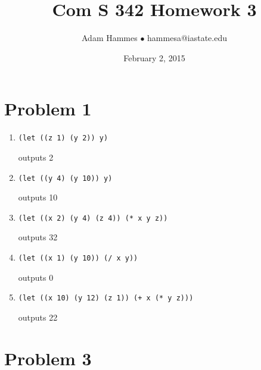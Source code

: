 \documentclass[11pt]{article}
\newcommand{\code}[1]{\texttt{#1}}
\begin{document}
\title{Com S 342 Homework 3}
\author{Adam Hammes $\bullet$ hammesa@iastate.edu}
\date{February 2, 2015}
\maketitle


\section*{Problem 1}

\begin{enumerate}
	\item 
		\code{(let ((z 1) (y 2)) y)}

		outputs 2

	\item
		\code{(let ((y 4) (y 10)) y)}

		outputs 10

	\item
		\code{(let ((x 2) (y 4) (z 4)) (* x y z))}

		outputs 32

	\item
		\code{(let ((x 1) (y 10)) (/ x y))}

		outputs 0

	\item
		\code{(let ((x 10) (y 12) (z 1)) (+ x (* y z)))}

		outputs 22

\end{enumerate}


\section*{Problem 3}
\end{document}
